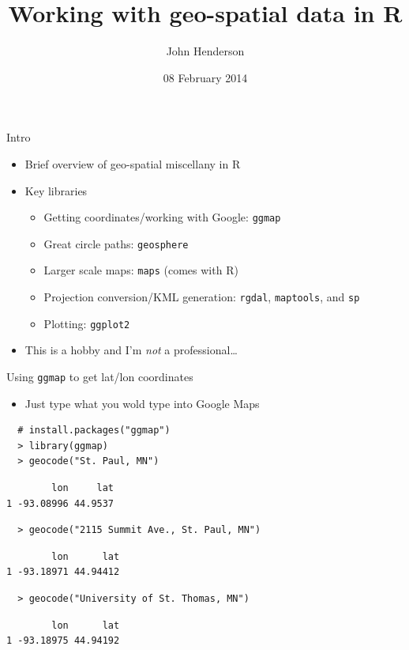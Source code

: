 \documentclass[sans,aspectratio=169,presentation,bigger,fleqn]{beamer}
\author{John Henderson}
\date{08 February 2014}
\title{Working with geo-spatial data in R}
\begin{document}
\maketitle


\begin{frame}[fragile,label=sec-1]{Intro}
 \begin{itemize}
\item Brief overview of geo-spatial miscellany in R
\item Key libraries
\begin{itemize}
\item Getting coordinates/working with Google: \texttt{ggmap}
\item Great circle paths: \texttt{geosphere}
\item Larger scale maps: \texttt{maps} (comes with R)
\item Projection conversion/KML generation: \texttt{rgdal}, \texttt{maptools}, and \texttt{sp}
\item Plotting: \texttt{ggplot2}
\end{itemize}
\end{itemize}
\pause

\begin{itemize}
\item This is a hobby and I'm \emph{not} a professional\ldots{}
\end{itemize}
\end{frame}
\begin{frame}[fragile,label=sec-2]{Using \texttt{ggmap} to get lat/lon coordinates}
 \begin{itemize}
\item Just type what you wold type into Google Maps
\end{itemize}


\scriptsize

\begin{verbatim}
  # install.packages("ggmap")
  > library(ggmap)
  > geocode("St. Paul, MN")
\end{verbatim}

\begin{verbatim}
        lon     lat
1 -93.08996 44.9537
\end{verbatim}


\begin{verbatim}
  > geocode("2115 Summit Ave., St. Paul, MN")
\end{verbatim}

\begin{verbatim}
        lon      lat
1 -93.18971 44.94412
\end{verbatim}

\begin{verbatim}
  > geocode("University of St. Thomas, MN")
\end{verbatim}

\begin{verbatim}
        lon      lat
1 -93.18975 44.94192
\end{verbatim}

\normalsize
\end{frame}
\end{document}
